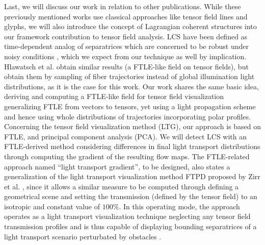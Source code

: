 \documentclass{scrartcl}
\begin{document}
Last, we will discuss our work in relation to other publications. While these previously mentioned works use classical approaches like tensor field lines and glyphs, we will also introduce the concept of Lagrangian coherent structures into our framework contribution to tensor field analysis. LCS have been defined as time-dependent analog of separatrices \cite{haller} which are concerned to be robust under noisy conditions \cite{haller2}, which we expect from our technique as well by implication. Hlawatsch et al. \cite{hlawatsch} obtain similar results (a FTLE-like field on tensor fields), but obtain them by sampling of fiber trajectories instead of global illumination light distributions, as it is the case for this work. Our work shares the same basic idea, deriving and computing a FTLE-like field for tensor field visualization generalizing FTLE from vectors to tensors, yet using a light propagation scheme and hence using whole distributions of trajectories incorporating polar profiles. Concerning the tensor field visualization method (LTG), our approach is based on FTLE, and principal component analysis (PCA). We will detect LCS with an FTLE-derived method considering differences in final light transport distributions through computing the gradient of the resulting flow maps. The FTLE-related approach named ``light transport gradient'', to be designed, also states a generalization of the light transport visualization method FTPD proposed by Zirr et al. \cite{zirr}, since it allows a similar measure to be computed through defining a geometrical scene and setting the transmission (defined by the tensor field) to an isotropic and constant value of $100\%$. In this operating mode, the approach operates as a light transport visualization technique neglecting any tensor field transmission profiles and is thus capable of displaying bounding separatrices of a light transport scenario perturbated by obstacles \cite{zirr}. 


%
%
%
\end{document}

